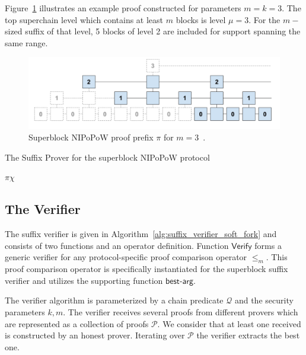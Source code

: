 Figure~\ref{fig:suffix} illustrates an example proof constructed for parameters $m=k=3$. The top superchain level which contains at least $m$ blocks is level $\mu = 3$. For the $m-$sized suffix of that level, 5 blocks of level 2 are included for support spanning the same range.

\begin{figure}[h!]
	\begin{center}
		\includegraphics[width=0.8\columnwidth]{figures/suffix.pdf}
	\end{center}
	\caption{Superblock NIPoPoW proof prefix $\pi$ for $m = 3$~\cite{nipopows}.}
	\label{fig:suffix}
\end{figure}

\begin{algorithm}[h]
		\caption{\label{alg:suffix_prover_soft_fork}The Suffix Prover for the superblock NIPoPoW protocol~\cite{nipopows}}
		\begin{algorithmic}[1]
						\Let{\pi}{\pi \cup \alpha}
					\EndFor
					\Let{\chi}{\chain[-k{:}]}
					\State\Return$\pi\chi$
				\EndFunction
		\end{algorithmic}
\end{algorithm}

\subsection{The Verifier}
The suffix verifier is given in Algorithm~\ref{alg:suffix_verifier_soft_fork} and consists of two functions and an operator definition. Function $\mathsf{Verify}$ forms a generic verifier for any protocol-specific proof comparison operator $\leq_m$. This proof comparison operator is specifically instantiated for the superblock suffix verifier and utilizes the supporting function $\mathsf{best\text{-}arg}$.

The verifier algorithm is parameterized by a chain predicate $\mathcal{Q}$ and the security parameters $k, m$. The verifier receives several proofs from different provers which are represented as a collection of proofs $\mathcal{P}$. We consider that at least one received is constructed by an honest prover. Iterating over $\mathcal{P}$ the verifier extracts the best one.

